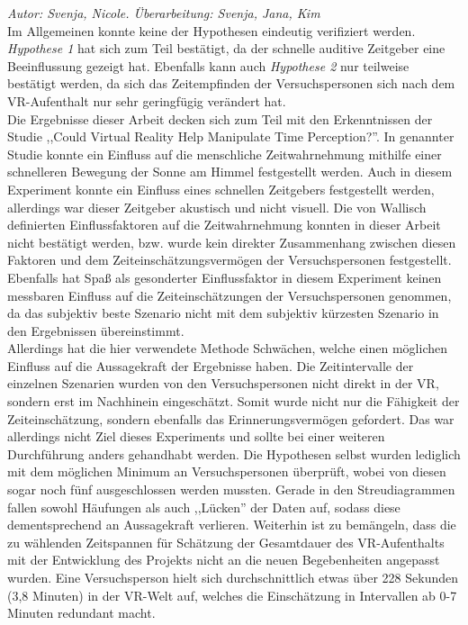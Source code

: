 \documentclass{Paper}
\begin{document}
 \textit{Autor: Svenja, Nicole. Überarbeitung: Svenja, Jana, Kim}\\
Im Allgemeinen konnte keine der Hypothesen eindeutig verifiziert werden. \textit{Hypothese 1} hat sich zum Teil bestätigt, da der schnelle auditive Zeitgeber eine Beeinflussung gezeigt hat. Ebenfalls kann auch \textit{Hypothese 2} nur teilweise bestätigt werden, da sich das Zeitempfinden der Versuchspersonen sich nach dem VR-Aufenthalt nur sehr geringfügig verändert hat.\\
Die Ergebnisse dieser Arbeit decken sich zum Teil mit den Erkenntnissen der Studie ,,Could Virtual Reality Help Manipulate Time Perception?''\cite{DeviceSystems2016}. In genannter Studie konnte ein Einfluss auf die menschliche Zeitwahrnehmung mithilfe einer schnelleren Bewegung der Sonne am Himmel festgestellt werden. Auch in diesem Experiment konnte ein Einfluss eines schnellen Zeitgebers festgestellt werden, allerdings war dieser Zeitgeber akustisch und nicht visuell.
Die von Wallisch definierten Einflussfaktoren auf die Zeitwahrnehmung\cite{Wallisch2003} konnten in dieser Arbeit nicht bestätigt werden, bzw. wurde kein direkter Zusammenhang zwischen diesen Faktoren und dem Zeiteinschätzungsvermögen der Versuchspersonen festgestellt. Ebenfalls hat Spaß als gesonderter Einflussfaktor\cite{Welt24} in diesem Experiment keinen messbaren Einfluss auf die Zeiteinschätzungen der Versuchspersonen genommen, da das subjektiv beste Szenario nicht mit dem subjektiv kürzesten Szenario in den Ergebnissen übereinstimmt.\\
Allerdings hat die hier verwendete Methode Schwächen, welche einen möglichen Einfluss auf die Aussagekraft der Ergebnisse haben.
Die Zeitintervalle der einzelnen Szenarien wurden von den Versuchspersonen nicht direkt in der VR, sondern erst im Nachhinein eingeschätzt. Somit wurde nicht nur die Fähigkeit der Zeiteinschätzung, sondern ebenfalls das Erinnerungsvermögen gefordert. Das war allerdings nicht Ziel dieses Experiments und sollte bei einer weiteren Durchführung anders gehandhabt werden.
Die Hypothesen selbst wurden lediglich mit dem möglichen Minimum an Versuchspersonen überprüft, wobei von diesen sogar noch fünf ausgeschlossen werden mussten. Gerade in den Streudiagrammen fallen sowohl Häufungen als auch ,,Lücken'' der Daten auf, sodass diese dementsprechend an Aussagekraft verlieren.
Weiterhin ist zu bemängeln, dass die zu wählenden Zeitspannen für Schätzung der Gesamtdauer des VR-Aufenthalts mit der Entwicklung des Projekts nicht an die neuen Begebenheiten angepasst wurden. Eine Versuchsperson hielt sich durchschnittlich etwas über 228 Sekunden (3,8 Minuten) in der VR-Welt auf, welches die Einschätzung in Intervallen ab 0-7 Minuten redundant macht.\\ 
\end{document}

